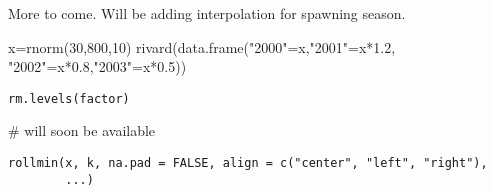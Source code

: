 \documentclass[a4paper]{book}
\begin{document}
%
\begin{Details}\relax
More to come.  Will be adding interpolation for spawning season.
\end{Details}
%
\begin{Examples}
\begin{ExampleCode}

x=rnorm(30,800,10)
rivard(data.frame("2000"=x,"2001"=x*1.2, "2002"=x*0.8,"2003"=x*0.5))

\end{ExampleCode}
\end{Examples}
\newpage
{}
%
\begin{Usage}
\begin{verbatim}
rm.levels(factor)
\end{verbatim}
\end{Usage}
%
\begin{Arguments}
\begin{ldescription}
\item[\code{factor}] 


\end{ldescription}
\end{Arguments}
%
\begin{Examples}
\begin{ExampleCode}
# will soon be available
\end{ExampleCode}
\end{Examples}
\newpage
{}
%
\begin{Usage}
\begin{verbatim}
rollmin(x, k, na.pad = FALSE, align = c("center", "left", "right"),
        ...)
\end{verbatim}
\end{Usage}
%
\begin{Arguments}
\begin{ldescription}
\item[\code{x}] 


\item[\code{k}] 


\item[\code{na.pad}] 


\item[\code{align}] 


\item[\code{...}] 


\end{ldescription}
\end{Arguments}
\end{document}
